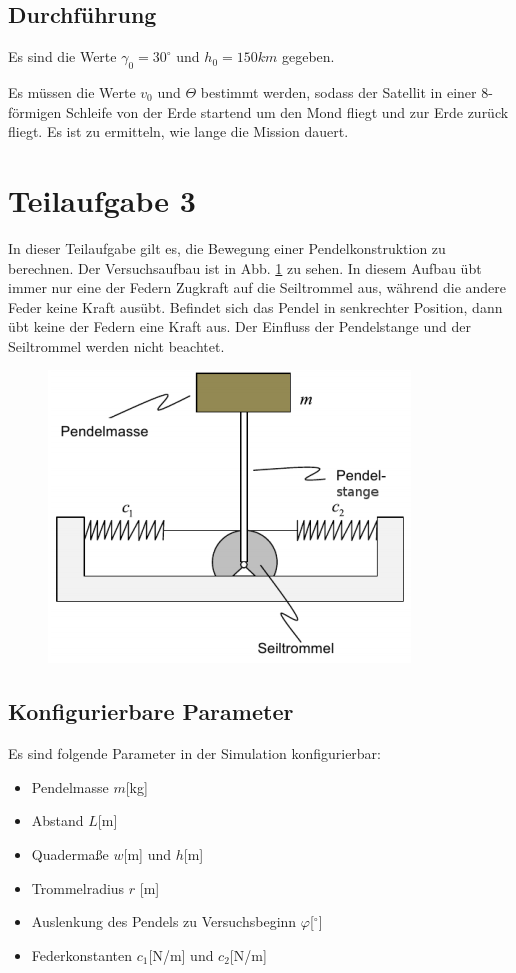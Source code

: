\documentclass[]{scrartcl}
\begin{document}
\subsection{Durchführung}
Es sind die Werte $\gamma_{0} = 30^\circ$ und $h_{0} = 150km$ gegeben.

Es müssen die Werte $v_{0}$ und $\Theta$ bestimmt werden, sodass der Satellit in einer 8-förmigen Schleife von der Erde startend um den Mond fliegt und zur Erde zurück fliegt. Es ist zu ermitteln, wie lange die Mission dauert.

\section{Teilaufgabe 3}
In dieser Teilaufgabe gilt es, die Bewegung einer Pendelkonstruktion zu berechnen. Der Versuchsaufbau ist in Abb. \ref{fig:3_Versuchsaufbau} zu sehen. In diesem Aufbau übt immer nur eine der Federn Zugkraft auf die Seiltrommel aus, während die andere Feder keine Kraft ausübt. Befindet sich das Pendel in senkrechter Position, dann übt keine der Federn eine Kraft aus. Der Einfluss der Pendelstange und der Seiltrommel werden nicht beachtet.

\begin{figure}[H]
\centering
\includegraphics[width=0.5\linewidth]{./3_Versuchsaufbau}
\caption{}
\label{fig:3_Versuchsaufbau}
\end{figure}

\subsection{Konfigurierbare Parameter}
Es sind folgende Parameter in der Simulation konfigurierbar:
\begin{itemize}
\item Pendelmasse $m$[kg]
\item Abstand $L$[m]
\item Quadermaße $w$[m] und $h$[m]
\item Trommelradius $r$ [m]
\item Auslenkung des Pendels zu Versuchsbeginn $\varphi$[$^\circ$]
\item Federkonstanten $c_{1}$[N/m] und $c_{2}$[N/m]
\end{itemize}
\end{document}
